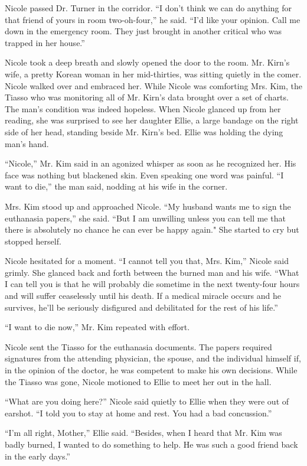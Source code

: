 \documentclass[]{article}
\begin{document}
{Nicole passed Dr.  Turner in the corridor.  “I don’t think we can do anything for that friend of yours in room two-oh-four,” he said.  “I’d like your opinion.  Call me down in the emergency room.  They just brought in another critical who was trapped in her house.”

Nicole took a deep breath and slowly opened the door to the room.  Mr.  Kirn’s wife, a pretty Korean woman in her mid-thirties, was sitting quietly in the comer.  Nicole walked over and embraced her.  While Nicole was comforting Mrs.  Kim, the Tiasso who was monitoring all of Mr.  Kirn’s data brought over a set of charts.  The man’s condition was indeed hopeless.  When Nicole glanced up from her reading, she was surprised to see her daughter Ellie, a large bandage on the right side of her head, standing beside Mr.  Kirn’s bed.  Ellie was holding the dying man’s hand.

“Nicole,” Mr.  Kim said in an agonized whisper as soon as he recognized her.  His face was nothing but blackened skin.  Even speaking one word was painful.  “I want to die,” the man said, nodding at his wife in the corner.

Mrs.  Kim stood up and approached Nicole.  “My husband wants me to sign the euthanasia papers,” she said.  “But I am unwilling unless you can tell me that there is absolutely no chance he can ever be happy again."  She started to cry but stopped herself.

Nicole hesitated for a moment.  “I cannot tell you that, Mrs.  Kim,” Nicole said grimly.  She glanced back and forth between the burned man and his wife.  “What I can tell you is that he will probably die sometime in the next twenty-four hours and will suffer ceaselessly until his death.  If a medical miracle occurs and he survives, he’ll be seriously disfigured and debilitated for the rest of his life.”

“I want to die now,” Mr.  Kim repeated with effort.

Nicole sent the Tiasso for the euthanasia documents.  The papers required signatures from the attending physician, the spouse, and the individual himself if, in the opinion of the doctor, he was competent to make his own decisions.  While the Tiasso was gone, Nicole motioned to Ellie to meet her out in the hall.

“What are you doing here?” Nicole said quietly to Ellie when they were out of earshot.  “I told you to stay at home and rest.  You had a bad concussion.”

“I’m all right, Mother,” Ellie said.  “Besides, when I heard that Mr.  Kim was badly burned, I wanted to do something to help.  He was such a good friend back in the early days.”

}
\end{document}
